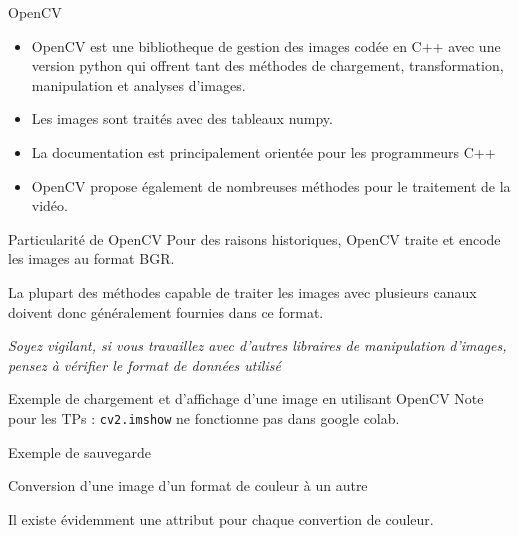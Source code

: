
\begin{frame}{OpenCV}
    \begin{itemize}
        \item OpenCV est une bibliotheque de gestion des images codée en C++ avec une version python qui offrent tant des méthodes de chargement, transformation, manipulation et analyses d'images.
        \item Les images sont traités avec des tableaux numpy.
        \item La documentation est principalement orientée pour les programmeurs C++
        \item OpenCV propose également de nombreuses méthodes pour le traitement de la vidéo.
    \end{itemize}
\end{frame}

\begin{frame}{Particularité de OpenCV}
    Pour des raisons historiques, OpenCV traite et encode les images au format \alert{BGR}.

    La plupart des méthodes capable de traiter les images avec plusieurs canaux doivent donc généralement fournies dans ce format.

    \begin{center}
        \textit{Soyez vigilant, si vous travaillez avec d'autres libraires de manipulation d'images, pensez à vérifier le format de données utilisé}
    \end{center}

\end{frame}

\begin{frame}{Exemple de chargement et d'affichage d'une image en utilisant OpenCV}
    \vfill
    \alert{Note pour les TPs} : \texttt{cv2.imshow} ne fonctionne pas dans google colab.
\end{frame}

\begin{frame}{Exemple de sauvegarde}
\end{frame}

\begin{frame}{Conversion d'une image d'un format de couleur à un autre}
    
    Il existe évidemment une attribut pour chaque convertion de couleur.
\end{frame}

